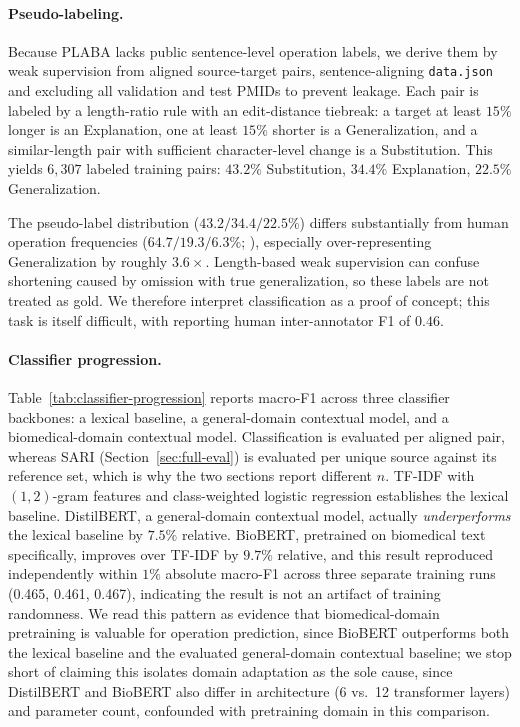 \documentclass[11pt]{article}
\begin{document}
\paragraph{Pseudo-labeling.} Because PLABA lacks public sentence-level operation
labels, we derive them by weak supervision from aligned source-target pairs,
sentence-aligning \texttt{data.json} and excluding all validation and test PMIDs
to prevent leakage. Each pair is labeled by a length-ratio rule with an
edit-distance tiebreak: a target at least $15\%$ longer is an Explanation, one at
least $15\%$ shorter is a Generalization, and a similar-length pair with
sufficient character-level change is a Substitution. This yields $6{,}307$ labeled
training pairs: $43.2\%$ Substitution, $34.4\%$ Explanation, $22.5\%$
Generalization.

The pseudo-label distribution ($43.2/34.4/22.5\%$) differs substantially from
human operation frequencies ($64.7/19.3/6.3\%$; \citealp{ondov2025lessons}),
especially over-representing Generalization by roughly $3.6\times$.
Length-based weak supervision can confuse shortening caused by omission with
true generalization, so these labels are not treated as gold. We therefore
interpret classification as a proof of concept; this task is itself
difficult, with \citet{ondov2025lessons} reporting human inter-annotator F1
of $0.46$.

\paragraph{Classifier progression.} Table~\ref{tab:classifier-progression}
reports macro-F1 across three classifier backbones: a lexical baseline, a
general-domain contextual model, and a biomedical-domain contextual model.
Classification is evaluated per aligned pair, whereas SARI
(Section~\ref{sec:full-eval}) is evaluated per unique source against its
reference set, which is why the two sections report different $n$.
TF-IDF with $(1,2)$-gram features and class-weighted logistic regression
establishes the lexical baseline. DistilBERT, a general-domain contextual
model, actually \emph{underperforms} the lexical baseline by $7.5\%$
relative. BioBERT, pretrained on biomedical text specifically, improves over
TF-IDF by $9.7\%$ relative, and this result reproduced independently within
$1\%$ absolute macro-F1 across three separate training runs (0.465, 0.461,
0.467), indicating the result is not an artifact of training randomness. We
read this pattern as evidence that biomedical-domain pretraining is valuable
for operation prediction, since BioBERT outperforms both the lexical
baseline and the evaluated general-domain contextual baseline; we stop short
of claiming this isolates domain adaptation as the sole cause, since
DistilBERT and BioBERT also differ in architecture (6 vs.\ 12 transformer
layers) and parameter count, confounded with pretraining domain in this
comparison.
\end{document}
